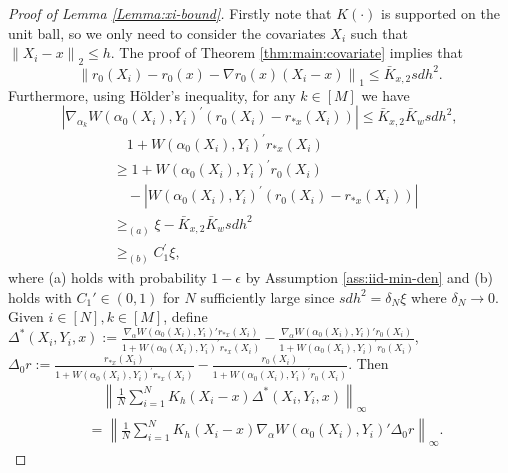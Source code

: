\documentclass[11pt]{article}
\newcommand{\norm}[1]{\left\lVert #1 \right\rVert}
\begin{document}
\begin{proof}[Proof of Lemma \ref{Lemma:xi-bound}]
Firstly note that $K(\cdot)$ is supported on the unit ball, so we only need to consider the covariates $X_i$ such that $\norm{X_i-x}_2\leq h$. The proof of Theorem \ref{thm:main:covariate} implies that  
$$\norm{r_0(X_i)-r_0(x)-\nabla r_0(x)(X_i-x)}_1\leq \bar{K}_{x,2}sdh^2.$$ 
Furthermore, using H\"older's inequality, for any $k\in[M]$ we have 
$$\left|\nabla_{\alpha_k} W(\alpha_0(X_i),Y_i)^\prime\left(r_0(X_i)-r_{*x}(X_i)\right)\right|\leq \bar{K}_{x,2}\bar{K}_wsdh^2,$$
\begin{equation}\label{eq:feasible-r*}
\begin{array}{rl}
&\quad1+W(\alpha_0(X_i),Y_i)^\prime r_{*x}(X_i)\\
&\geq1+W(\alpha_0(X_i),Y_i)^\prime r_0(X_i)\\
&\quad\displaystyle-|W(\alpha_0(X_i),Y_i)^\prime\left(r_0(X_i)-r_{*x}(X_i)\right)|\\
&\geq_{(a)}\xi-\bar{K}_{x,2}\bar{K}_wsdh^2\\
&\geq_{(b)} C_1^\prime\xi,
\end{array}
\end{equation}
where (a) holds with probability $1-\epsilon$ by Assumption \ref{ass:iid-min-den} and (b) holds with $C_1'\in(0,1)$ for $N$ sufficiently large since $sdh^2=\delta_N\xi$ where $\delta_N\rightarrow0$. Given $i\in[N], k\in[M]$, define $\Delta^{*}(X_i,Y_i,x):=\frac{\nabla_{\alpha} W(\alpha_0(X_i),Y_i)' r_{*x}(X_i)}{1+W(\alpha_0(X_i),Y_i)^\prime r_{*x}(X_i)}-\frac{\nabla_{\alpha} W(\alpha_0(X_i),Y_i)'r_0(X_i)}{1+W(\alpha_0(X_i),Y_i)^\prime r_0(X_i)}$, $\Delta_0r:=\frac{r_{*x}(X_i)}{1+W(\alpha_0(X_i),Y_i)^\prime r_{*x}(X_i)}-\frac{r_0(X_i)}{1+W(\alpha_0(X_i),Y_i)^\prime r_0(X_i)}$. Then 
\begin{equation}\label{eq:target:bound}
\begin{array}{rl}
    &\displaystyle\quad\left\|\frac{1}{N}\sum_{i=1}^NK_h(X_i-x)\Delta^{*}(X_i,Y_i,x)\right\|_\infty\\
    &\displaystyle=\left\|\frac{1}{N}\sum_{i=1}^NK_h(X_i-x)\nabla_{\alpha} W(\alpha_0(X_i),Y_i)'\Delta_0r\right\|_\infty.
\end{array}
\end{equation}

\end{proof}
\end{document}
